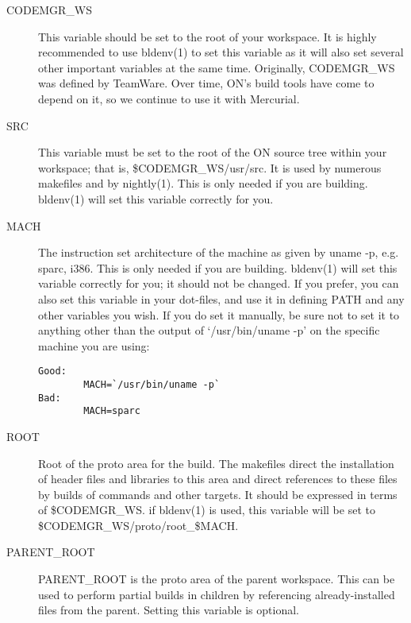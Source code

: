 \documentclass{article}
\begin{document}
\begin{description}

\item[CODEMGR\_WS]

  This variable should be set to the root of your workspace. It is highly
  recommended to use bldenv(1) to set this variable as it will also set several
  other important variables at the same time. Originally, CODEMGR\_WS was defined
  by TeamWare. Over time, ON's build tools have come to depend on it, so we
  continue to use it with Mercurial.

\item[SRC]

  This variable must be set to the root of the ON source tree within your
  workspace; that is, \${CODEMGR\_WS}/usr/src. It is used by numerous makefiles
  and by nightly(1). This is only needed if you are building. bldenv(1) will set
  this variable correctly for you.

\item[MACH]

  The instruction set architecture of the machine as given by uname -p,
  e.g. sparc, i386. This is only needed if you are building. bldenv(1) will set
  this variable correctly for you; it should not be changed. If you prefer, you
  can also set this variable in your dot-files, and use it in defining PATH and
  any other variables you wish. If you do set it manually, be sure not to set it
  to anything other than the output of `/usr/bin/uname -p' on the specific machine
  you are using:
\begin{verbatim}
Good:
        MACH=`/usr/bin/uname -p`
Bad:
        MACH=sparc
\end{verbatim}

\item[ROOT]

  Root of the proto area for the build. The makefiles direct the installation of
  header files and libraries to this area and direct references to these files by
  builds of commands and other targets. It should be expressed in terms of
  \$CODEMGR\_WS. if bldenv(1) is used, this variable will be set to
  \${CODEMGR\_WS}/proto/root\_\${MACH}.

\item[PARENT\_ROOT]

  PARENT\_ROOT is the proto area of the parent workspace. This can be used to
  perform partial builds in children by referencing already-installed files from
  the parent. Setting this variable is optional.


\end{description}
\end{document}

